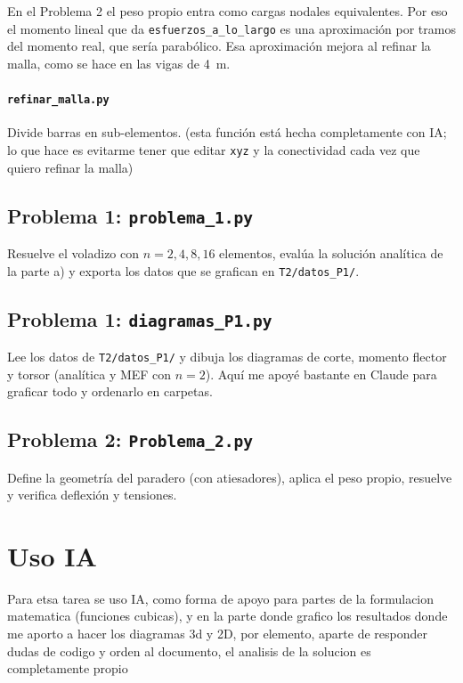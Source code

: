 En el Problema 2 el peso propio entra como cargas nodales equivalentes. Por eso el momento lineal que da \texttt{esfuerzos\_a\_lo\_largo} es una aproximación por tramos del momento real, que sería parabólico. Esa aproximación mejora al refinar la malla, como se hace en las vigas de 4~m.


\paragraph{\texttt{refinar\_malla.py}} Divide barras en sub-elementos. (esta función está hecha completamente con IA; lo que hace es evitarme tener que editar \texttt{xyz} y la conectividad cada vez que quiero refinar la malla)


\subsection*{Problema 1: \texttt{problema\_1.py}}
Resuelve el voladizo con $n=2,4,8,16$ elementos, eval\'ua la soluci\'on
anal\'itica de la parte a) y exporta los datos que se grafican en
\texttt{T2/datos\_P1/}.


\subsection*{Problema 1: \texttt{diagramas\_P1.py}}
Lee los datos de \texttt{T2/datos\_P1/} y dibuja los diagramas de corte,
momento flector y torsor (anal\'itica y MEF con $n=2$). Aquí me apoyé bastante en Claude para graficar todo y ordenarlo en carpetas.


\subsection*{Problema 2: \texttt{Problema\_2.py}}
Define la geometr\'ia del paradero (con atiesadores), aplica el peso propio,
resuelve y verifica deflexi\'on y tensiones.



\section{Uso IA}
Para etsa tarea se uso IA, como forma de apoyo para partes de la formulacion matematica (funciones cubicas), y en la parte donde grafico los resultados donde me aporto a hacer los diagramas 3d y 2D, por elemento, aparte de responder dudas de codigo y orden al documento, el analisis de la solucion es completamente propio